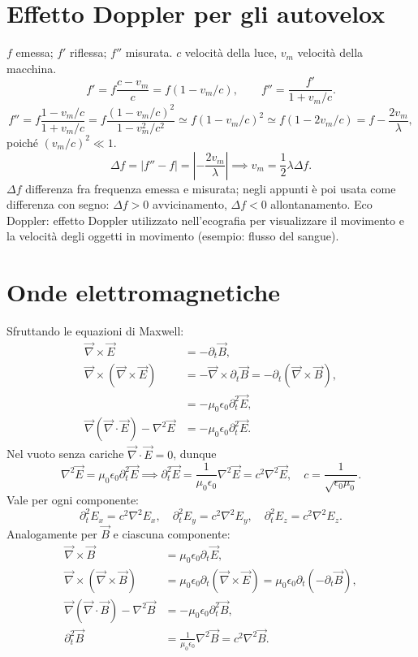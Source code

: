 \documentclass[11pt,a4paper]{article}
\newcommand{\pagina}[1]{\clearpage}
\newcommand{\vv}[1]{\vec{#1}}
\begin{document}
\section*{Effetto Doppler per gli autovelox}
$f$ emessa; $f'$ riflessa; $f''$ misurata. $c$ velocità della luce, $v_m$ velocità della macchina.
\[f'=f\frac{c-v_m}c=f(1-v_m/c),\qquad f''=\frac{f'}{1+v_m/c}.\]
\[f''=f\frac{1-v_m/c}{1+v_m/c}=f\frac{(1-v_m/c)^2}{1-v_m^2/c^2}\simeq f(1-v_m/c)^2\simeq f(1-2v_m/c)=f-\frac{2v_m}\lambda,\]
poiché $(v_m/c)^2\ll1$.
\[\Delta f=|f''-f|=\left|-\frac{2v_m}\lambda\right|\implies v_m=\frac12\lambda\Delta f.\]
$\Delta f$ differenza fra frequenza emessa e misurata; negli appunti è poi usata come differenza con segno: $\Delta f>0$ avvicinamento, $\Delta f<0$ allontanamento.
Eco Doppler: effetto Doppler utilizzato nell'ecografia per visualizzare il movimento e la velocità degli oggetti in movimento (esempio: flusso del sangue).
\pagina{17}\section*{Onde elettromagnetiche}
Sfruttando le equazioni di Maxwell:
\begin{align*}
\vv\nabla\times\vv E&=-\partial_t\vv B,\\
\vv\nabla\times(\vv\nabla\times\vv E)&=-\vv\nabla\times\partial_t\vv B=-\partial_t(\vv\nabla\times\vv B),\\
&=-\mu_0\epsilon_0\partial_t^2\vv E,\\
\vv\nabla(\vv\nabla\cdot\vv E)-\nabla^2\vv E&=-\mu_0\epsilon_0\partial_t^2\vv E.
\end{align*}
Nel vuoto senza cariche $\vv\nabla\cdot\vv E=0$, dunque
\[\nabla^2\vv E=\mu_0\epsilon_0\partial_t^2\vv E\implies\partial_t^2\vv E=\frac1{\mu_0\epsilon_0}\nabla^2\vv E=c^2\nabla^2\vv E,\quad c=\frac1{\sqrt{\epsilon_0\mu_0}}.\]
Vale per ogni componente:
\[\partial_t^2E_x=c^2\nabla^2E_x,\quad\partial_t^2E_y=c^2\nabla^2E_y,\quad\partial_t^2E_z=c^2\nabla^2E_z.\]
Analogamente per $\vv B$ e ciascuna componente:
\begin{align*}
\vv\nabla\times\vv B&=\mu_0\epsilon_0\partial_t\vv E,\\
\vv\nabla\times(\vv\nabla\times\vv B)&=\mu_0\epsilon_0\partial_t(\vv\nabla\times\vv E)=\mu_0\epsilon_0\partial_t(-\partial_t\vv B),\\
\vv\nabla(\vv\nabla\cdot\vv B)-\nabla^2\vv B&=-\mu_0\epsilon_0\partial_t^2\vv B,\\
\partial_t^2\vv B&=\frac1{\mu_0\epsilon_0}\nabla^2\vv B=c^2\nabla^2\vv B.
\end{align*}
\end{document}
